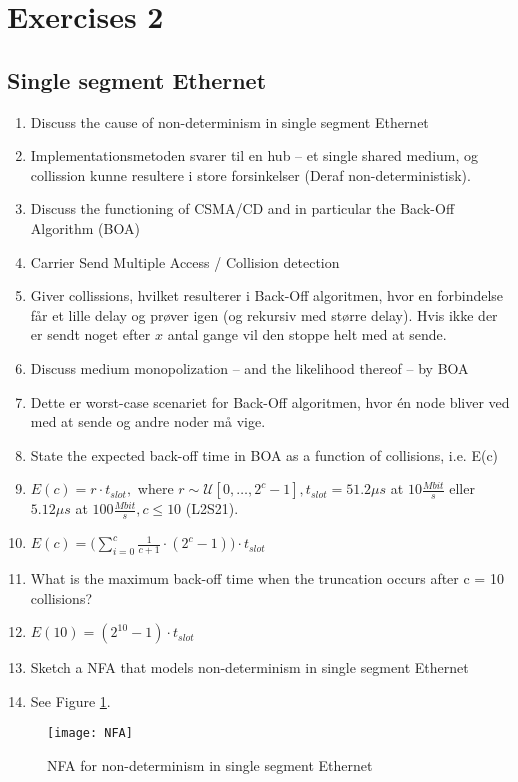 \documentclass[oneside, 10pt]{article}
\begin{document}
\section{Exercises 2}

\subsection{Single segment Ethernet}

\begin{enumerate}
	\item  Discuss the cause of non-determinism in single segment Ethernet
	\item [] Implementationsmetoden svarer til en hub -- et single shared medium, og collission kunne resultere i store forsinkelser (Deraf non-deterministisk).

	\item  Discuss the functioning of CSMA/CD and in particular the Back-Off Algorithm (BOA)
	\item [] Carrier Send Multiple Access / Collision detection
	\item [] Giver collissions, hvilket resulterer i Back-Off algoritmen, hvor en forbindelse får et lille delay og prøver igen (og rekursiv med større delay). 
	Hvis ikke der er sendt noget efter $x$ antal gange vil den stoppe helt med at sende.

	\item  Discuss medium monopolization – and the likelihood thereof – by BOA
	\item [] Dette er worst-case scenariet for Back-Off algoritmen, hvor én node bliver ved med at sende og andre noder må vige.

	\item  State the expected back-off time in BOA as a function of collisions, i.e. E(c)
	\item [] $E(c) = r \cdot t_{slot},$ where $r \sim \mathcal{U}[0, \ldots, 2^c-1], t_{slot} = 51.2 \mu s $ at $10 \frac{Mbit}{s} $ eller $ 5.12 \mu s$ at $100 \frac{Mbit}{s}, c \leq 10 $ (L2S21).
	\item [] $E(c) = \bigg(\sum\limits_{i=0}^c \frac{1}{c+1} \cdot (2^c-1)\bigg) \cdot t_{slot}$

	\item  What is the maximum back-off time when the truncation occurs after c = 10 collisions?
	\item[] $E(10) = (2^{10} - 1) \cdot t_{slot}$

	\item  Sketch a NFA that models non-determinism in single segment Ethernet
	\item[] See Figure \ref{fig:NFA}.

\end{enumerate}
\begin{figure}[hbtp]
\centering
\texttt{[image: NFA]}
\caption{NFA for non-determinism in single segment Ethernet}
\label{fig:NFA}
\end{figure}
\end{document}
